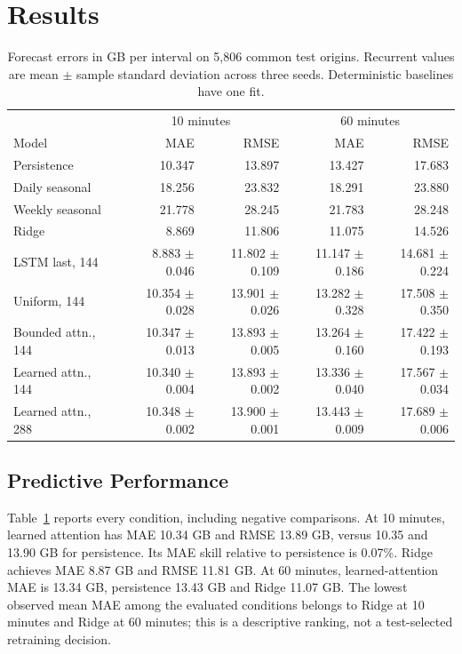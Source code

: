 \documentclass[conference]{IEEEtran}
\begin{document}
\section{Results}
\begin{table}[t]
\caption{Forecast errors in GB per interval on 5,806 common test origins. Recurrent values are mean $\pm$ sample standard deviation across three seeds. Deterministic baselines have one fit.}
\label{tab:forecast}\centering\small
\begin{tabular}{lrrrr}\toprule
 & \multicolumn{2}{c}{10 minutes} & \multicolumn{2}{c}{60 minutes}\\
Model & MAE & RMSE & MAE & RMSE\\\midrule
Persistence & 10.347 & 13.897 & 13.427 & 17.683 \\
Daily seasonal & 18.256 & 23.832 & 18.291 & 23.880 \\
Weekly seasonal & 21.778 & 28.245 & 21.783 & 28.248 \\
Ridge & 8.869 & 11.806 & 11.075 & 14.526 \\
LSTM last, 144 & 8.883 $\pm$ 0.046 & 11.802 $\pm$ 0.109 & 11.147 $\pm$ 0.186 & 14.681 $\pm$ 0.224 \\
Uniform, 144 & 10.354 $\pm$ 0.028 & 13.901 $\pm$ 0.026 & 13.282 $\pm$ 0.328 & 17.508 $\pm$ 0.350 \\
Bounded attn., 144 & 10.347 $\pm$ 0.013 & 13.893 $\pm$ 0.005 & 13.264 $\pm$ 0.160 & 17.422 $\pm$ 0.193 \\
Learned attn., 144 & 10.340 $\pm$ 0.004 & 13.893 $\pm$ 0.002 & 13.336 $\pm$ 0.040 & 17.567 $\pm$ 0.034 \\
Learned attn., 288 & 10.348 $\pm$ 0.002 & 13.900 $\pm$ 0.001 & 13.443 $\pm$ 0.009 & 17.689 $\pm$ 0.006 \\
\bottomrule\end{tabular}\end{table}
\subsection{Predictive Performance}
Table~\ref{tab:forecast} reports every condition, including negative comparisons. At 10 minutes, learned attention has MAE 10.34 GB and RMSE 13.89 GB, versus 10.35 and 13.90 GB for persistence. Its MAE skill relative to persistence is 0.07\%. Ridge achieves MAE 8.87 GB and RMSE 11.81 GB. At 60 minutes, learned-attention MAE is 13.34 GB, persistence 13.43 GB and Ridge 11.07 GB. The lowest observed mean MAE among the evaluated conditions belongs to Ridge at 10 minutes and Ridge at 60 minutes; this is a descriptive ranking, not a test-selected retraining decision.
\end{document}

